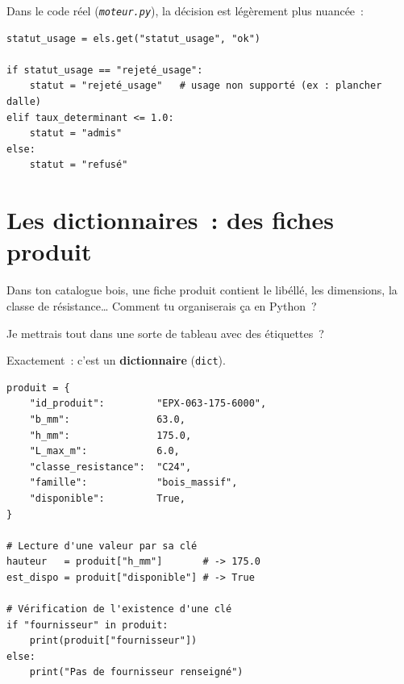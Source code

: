 \documentclass[12pt, a4paper, openany]{book}
\newcommand{\py}[1]{\texttt{#1}}
\newcommand{\fichier}[1]{\texttt{\textit{#1}}}
\begin{document}
Dans le code r\'eel (\fichier{moteur.py}), la d\'ecision est
l\'eg\`erement plus nuanc\'ee~:

\begin{lstlisting}[style=python, caption={Extrait de \fichier{moteur.py} --- logique de statut}]
statut_usage = els.get("statut_usage", "ok")

if statut_usage == "rejeté_usage":
    statut = "rejeté_usage"   # usage non supporté (ex : plancher dalle)
elif taux_determinant <= 1.0:
    statut = "admis"
else:
    statut = "refusé"
\end{lstlisting}

\section{Les dictionnaires~: des fiches produit}

\begin{maitre}
Dans ton catalogue bois, une fiche produit contient le lib\'ell\'e,
les dimensions, la classe de r\'esistance\ldots{}
Comment tu organiserais \c{c}a en Python~?
\end{maitre}

\begin{apprenti}
Je mettrais tout dans une sorte de tableau avec des \'etiquettes~?
\end{apprenti}

\begin{maitre}
Exactement~: c'est un \textbf{dictionnaire} (\py{dict}).
\end{maitre}

\begin{lstlisting}[style=python, caption={Dictionnaire --- fiche produit bois}]
produit = {
    "id_produit":         "EPX-063-175-6000",
    "b_mm":               63.0,
    "h_mm":               175.0,
    "L_max_m":            6.0,
    "classe_resistance":  "C24",
    "famille":            "bois_massif",
    "disponible":         True,
}

# Lecture d'une valeur par sa clé
hauteur   = produit["h_mm"]       # -> 175.0
est_dispo = produit["disponible"] # -> True

# Vérification de l'existence d'une clé
if "fournisseur" in produit:
    print(produit["fournisseur"])
else:
    print("Pas de fournisseur renseigné")
\end{lstlisting}
\end{document}
